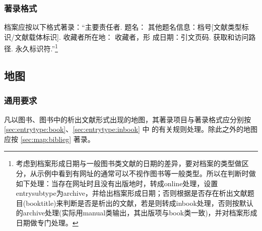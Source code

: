 \documentclass[twoside]{article}%
\begin{document}

\subsubsection{著录格式}\label{sec:archive:biblieg}

档案应按以下格式著录：“主要责任者. 题名： 其他题名信息：档号[文献类型标识/文献载体标识]. 收藏者所在地： 收藏者，形
成日期：引文页码. 获取和访问路径. 永久标识符.”\footnote{考虑到档案形成日期与一般图书类文献的日期的差异，要对档案的类型做区分，从示例中看到有网址的通常可以不视作图书等一般类型。所以在判断时做如下处理：当存在网址时且没有出版地时，转成online处理，设置entrysubtype为archive，并给出档案形成日期；否则根据是否存在析出文献题目(booktitle)来判断是否是析出的文献，若是则转成inbook处理，否则按默认的archive处理(实际用manual类输出，其出版项与book类一致)，并对档案形成日期做专门处理。}





\subsection{地图}\label{sec:entrytype:map}

\subsubsection{通用要求}

凡以图书、图书中的析出文献形式出现的地图，其著录项目与著录格式应分别按 \ref{sec:entrytype:book}、\ref{sec:entrytype:inbook} 中
的有关规则处理。除此之外的地图应按 \ref{sec:map:biblieg} 著录。
\end{document}
